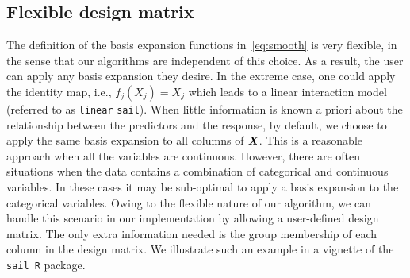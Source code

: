 \documentclass[a4paper,fleqn]{cas-sc}
\newcommand{\sail}{\texttt{sail}}
\newcommand{\bX}{\textbf{\emph{X}}}
\begin{document}
\subsection{Flexible design matrix} \label{sec:linearsail}

The definition of the basis expansion functions in~\eqref{eq:smooth} is very flexible, in the sense that our algorithms are independent of this choice. 
As a result, the user can apply any basis expansion they desire. 
In the extreme case, one could apply the identity map, i.e., $f_j(X_j) = X_j$ which leads to a linear interaction model (referred to as \texttt{linear} \sail). 
When little information is known a priori about the relationship between the predictors and the response, by default, we choose to apply the same basis expansion to all columns of $\bX$. 
This is a reasonable approach when all the variables are continuous. 
However, there are often situations when the data contains a combination of categorical and continuous variables. 
In these cases it may be sub-optimal to apply a basis expansion to the categorical variables.
Owing to the flexible nature of our algorithm, we can handle this scenario in our implementation by allowing a user-defined design matrix. 
The only extra information needed is the group membership of each column in the design matrix. We illustrate such an example in a vignette of the \sail ~\texttt{R} package.
\end{document}
